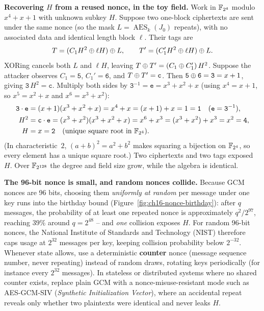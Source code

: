 \begin{attackbox}
\textbf{Recovering $H$ from a reused nonce, in the toy field.} Work in $\mathbb{F}_{2^4}$ modulo $x^4+x+1$ with unknown subkey $H$. Suppose two one-block ciphertexts are sent under the same nonce (so the mask $L = \operatorname{AES}_k(J_0)$ repeats), with no associated data and identical length block $\ell$. Their tags are
\[
T = (C_1 H^2 \oplus \ell H) \oplus L, \qquad T' = (C_1' H^2 \oplus \ell H) \oplus L.
\]
XORing cancels both $L$ and $\ell H$, leaving $T \oplus T' = (C_1 \oplus C_1')\,H^2$. Suppose the attacker observes $C_1 = \texttt{5}$, $C_1' = \texttt{6}$, and $T \oplus T' = \texttt{c}$. Then $\texttt{5} \oplus \texttt{6} = \texttt{3} = x + 1$, giving $\texttt{3}\,H^2 = \texttt{c}$. Multiply both sides by $\texttt{3}^{-1} = \texttt{e} = x^3 + x^2 + x$ (using $x^4 = x+1$, so $x^5 = x^2+x$ and $x^6 = x^3+x^2$):
\begin{align*}
\texttt{3} \cdot \texttt{e} &= (x+1)(x^3 + x^2 + x) = x^4 + x = (x+1) + x = 1 = \texttt{1} \quad\text{($\texttt{e} = \texttt{3}^{-1}$)}, \\
H^2 &= \texttt{c} \cdot \texttt{e} = (x^3 + x^2)(x^3 + x^2 + x) = x^6 + x^3 = (x^3 + x^2) + x^3 = x^2 = \texttt{4}, \\
H   &= x = \texttt{2} \quad\text{(unique square root in $\mathbb{F}_{2^4}$)}.
\end{align*}
(In characteristic~$2$, $(a+b)^2 = a^2 + b^2$ makes squaring a bijection on $\mathbb{F}_{2^4}$, so every element has a unique square root.) Two ciphertexts and two tags exposed $H$. Over $\mathbb{F}_{2^{128}}$ the degree and field size grow, while the algebra is identical.
\end{attackbox}

\begin{trapbox}
\textbf{The 96-bit nonce is small, and random nonces collide.} Because GCM nonces are 96 bits, choosing them \emph{uniformly at random} per message under one key runs into the birthday bound (Figure~\ref{fig:ch16-nonce-birthday}): after $q$ messages, the probability of at least one repeated nonce is approximately $q^2 / 2^{97}$, reaching $39\%$ around $q = 2^{48}$ -- and \emph{one} collision exposes $H$. For random 96-bit nonces, the National Institute of Standards and Technology (NIST) therefore caps usage at $2^{32}$ messages per key, keeping collision probability below $2^{-32}$. Whenever state allows, use a deterministic \textbf{counter} nonce (message sequence number, never repeating) instead of random draws, rotating keys periodically (for instance every $2^{32}$ messages). In stateless or distributed systems where no shared counter exists, replace plain GCM with a nonce-misuse-resistant mode such as AES-GCM-SIV (\emph{Synthetic Initialization Vector}), where an accidental repeat reveals only whether two plaintexts were identical and never leaks $H$.
\end{trapbox}

